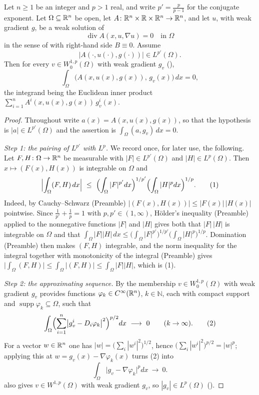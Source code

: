 \begin{lemma}
Let $n\ge1$ be an integer and $p>1$ real, and write $p'=\frac p{p-1}$ for the
conjugate exponent.  Let $\Omega\subseteq\mathbb{R}^n$ be open, let
$A\colon\mathbb{R}^n\times\mathbb{R}\times\mathbb{R}^n\to\mathbb{R}^n$, and let $u$, with weak gradient $g$, be a
weak solution of
\[
\operatorname{div}A(x,u,\nabla u)=0\quad\text{in }\Omega
\]
in the sense of  with right-hand side $B\equiv0$.
Assume
\[
\bigl|A(\cdot,u(\cdot),g(\cdot))\bigr|\in L^{p'}(\Omega).
\]
Then for every $v\in W^{1,p}_0(\Omega)$ with weak gradient $g_v$
(),
\[
\int_\Omega\bigl(A(x,u(x),g(x)),\,g_v(x)\bigr)\,dx=0 ,
\]
the integrand being the Euclidean inner product
$\sum_{i=1}^n A^i(x,u(x),g(x))\,g_v^i(x)$.
\end{lemma}
\begin{proof}
Throughout write $a(x)=A(x,u(x),g(x))$, so that the hypothesis is
$|a|\in L^{p'}(\Omega)$ and the assertion is
$\int_\Omega(a,g_v)\,dx=0$.

\emph{Step 1: the pairing of $L^{p'}$ with $L^{p}$.}  We record once, for later
use, the following.  Let $F,H\colon\Omega\to\mathbb{R}^n$ be measurable with
$|F|\in L^{p'}(\Omega)$ and $|H|\in L^{p}(\Omega)$.  Then
$x\mapsto(F(x),H(x))$ is integrable on $\Omega$ and
\[
\Bigl|\int_\Omega(F,H)\,dx\Bigr|
\ \le\ \Bigl(\int_\Omega|F|^{p'}dx\Bigr)^{1/p'}
\Bigl(\int_\Omega|H|^{p}dx\Bigr)^{1/p} .
\tag{1}
\]
Indeed, by Cauchy--Schwarz (Preamble) $|(F(x),H(x))|\le|F(x)|\,|H(x)|$
pointwise.  Since $\tfrac1{p'}+\tfrac1p=1$ with $p,p'\in(1,\infty)$, H\"older's
inequality (Preamble) applied to the nonnegative functions $|F|$ and $|H|$ gives
both that $|F|\,|H|$ is integrable on $\Omega$ and that
$\int_\Omega|F||H|\,dx\le\bigl(\int_\Omega|F|^{p'}\bigr)^{1/p'}
\bigl(\int_\Omega|H|^{p}\bigr)^{1/p}$.  Domination (Preamble) then makes
$(F,H)$ integrable, and the norm inequality for the integral together with
monotonicity of the integral (Preamble) gives
$\bigl|\int_\Omega(F,H)\bigr|\le\int_\Omega|(F,H)|\le\int_\Omega|F||H|$, which
is (1).

\emph{Step 2: the approximating sequence.}  By  the
membership $v\in W^{1,p}_0(\Omega)$ with weak gradient $g_v$ provides functions
$\varphi_k\in C^\infty(\mathbb{R}^n)$, $k\in\mathbb N$, each with compact support and
$\operatorname{supp}\varphi_k\subseteq\Omega$, such that
\[
\int_\Omega\Bigl(\sum_{i=1}^n\bigl|g_v^i-D_i\varphi_k\bigr|^2\Bigr)^{p/2}dx
\ \longrightarrow\ 0
\qquad(k\to\infty).
\tag{2}
\]
For a vector $w\in\mathbb{R}^n$ one has $|w|=\bigl(\sum_i|w^i|^2\bigr)^{1/2}$, hence
$\bigl(\sum_i|w^i|^2\bigr)^{p/2}=|w|^{p}$; applying this at
$w=g_v(x)-\nabla\varphi_k(x)$ turns (2) into
\[
\int_\Omega\bigl|g_v-\nabla\varphi_k\bigr|^{p}dx\ \longrightarrow\ 0 .
\tag{2'}
\]
 also gives $v\in W^{1,p}(\Omega)$ with weak gradient
$g_v$, so $|g_v|\in L^{p}(\Omega)$ ().


\end{proof}
